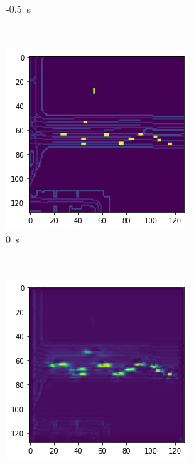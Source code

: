 \documentclass[12pt]{article}
\begin{document}
\begin{figure}[H]
\begin{subfigure}[b]{0.18\textwidth}
            \caption{-0.5~s}
        \end{subfigure}
        ~
        \begin{subfigure}[b]{0.18\textwidth}
            \includegraphics[width=\textwidth]{output_static_brake_2.png}
            \caption{0~s}
        \end{subfigure}
        ~
        \begin{subfigure}[b]{0.18\textwidth}
            \includegraphics[width=\textwidth]{output_static_brake_3.png}

\end{subfigure}
\end{figure}
\end{document}
